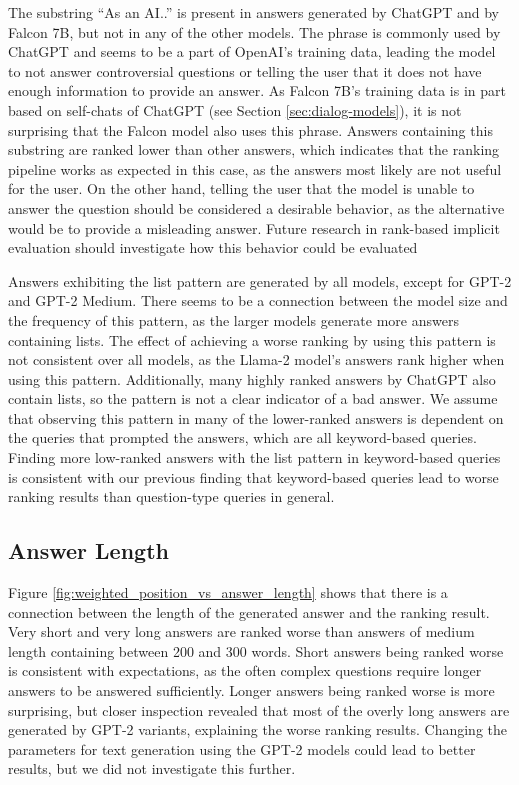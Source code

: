 The substring ``As an AI..'' is present in answers generated by ChatGPT and by Falcon 7B, but not in any of the other models.
The phrase is commonly used by ChatGPT and seems to be a part of OpenAI's training data, leading the model to not answer controversial questions or telling the user that it does not have enough information to provide an answer.
As Falcon 7B's training data is in part based on self-chats of ChatGPT (see Section \ref{sec:dialog-models}), it is not surprising that the Falcon model also uses this phrase.
Answers containing this substring are ranked lower than other answers, which indicates that the ranking pipeline works as expected in this case, as the answers most likely are not useful for the user.
On the other hand, telling the user that the model is unable to answer the question should be considered a desirable behavior, as the alternative would be to provide a misleading answer.
Future research in rank-based implicit evaluation should investigate how this behavior could be evaluated

Answers exhibiting the list pattern are generated by all models, except for GPT-2 and GPT-2 Medium.
There seems to be a connection between the model size and the frequency of this pattern, as the larger models generate more answers containing lists.
The effect of achieving a worse ranking by using this pattern is not consistent over all models, as the Llama-2 model's answers rank higher when using this pattern.
Additionally, many highly ranked answers by ChatGPT also contain lists, so the pattern is not a clear indicator of a bad answer.
We assume that observing this pattern in many of the lower-ranked answers is dependent on the queries that prompted the answers, which are all keyword-based queries.
Finding more low-ranked answers with the list pattern in keyword-based queries is consistent with our previous finding that keyword-based queries lead to worse ranking results than question-type queries in general.

\subsection{Answer Length}
Figure \ref{fig:weighted_position_vs_answer_length} shows that there is a connection between the length of the generated answer and the ranking result.
Very short and very long answers are ranked worse than answers of medium length containing between 200 and 300 words.
Short answers being ranked worse is consistent with expectations, as the often complex questions require longer answers to be answered sufficiently.
Longer answers being ranked worse is more surprising, but closer inspection revealed that most of the overly long answers are generated by GPT-2 variants, explaining the worse ranking results.
Changing the parameters for text generation using the GPT-2 models could lead to better results, but we did not investigate this further.
